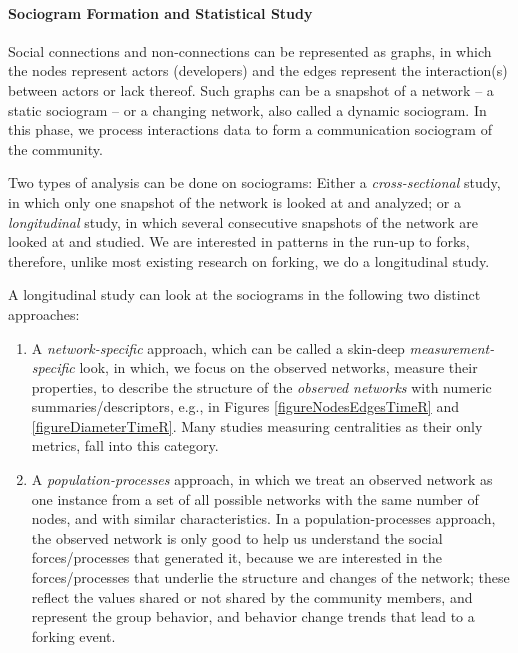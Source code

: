 \documentclass[12pt]{report}
\begin{document}
\paragraph*{Sociogram Formation and Statistical Study}

Social connections and non-connections can be represented as graphs, in which the nodes represent actors (developers) and the edges represent the interaction(s) between actors or lack thereof. Such graphs can be a snapshot of a network -- a static sociogram -- or a changing network, also called a dynamic sociogram. In this phase, we process interactions data to form a communication sociogram of the community. 

Two types of analysis can be done on sociograms: Either a \textit{cross-sectional} study, in which only one snapshot of the network is looked at and analyzed; or a \textit{longitudinal} study, in which several consecutive snapshots of the network are looked at and studied.  We are interested in patterns in the run-up to forks, therefore, unlike most existing research on forking, we do a longitudinal study.

A longitudinal study can look at the sociograms in the following two distinct approaches: 
\begin{enumerate}
\item A \textit{network-specific} approach, which can be called a skin-deep \textit{measurement-specific} look, in which, we focus on the observed networks, measure their properties, to describe the structure of the \textit{observed networks} with numeric summaries/descriptors, e.g., in Figures \ref{figureNodesEdgesTimeR} and \ref{figureDiameterTimeR}. Many studies measuring centralities as their only metrics, fall into this category. 

\item A \textit{population-processes} approach, in which we treat an observed network as one instance from a set of all possible networks with the same number of nodes, and with similar characteristics. In a population-processes approach, the observed network is only good to help us understand the social forces/processes that generated it, because we are interested in the forces/processes that underlie the structure and changes of the network; these reflect the values shared or not shared by the community members, and represent the group behavior, and behavior change trends that lead to a forking event. 

\end{enumerate}
\end{document}
